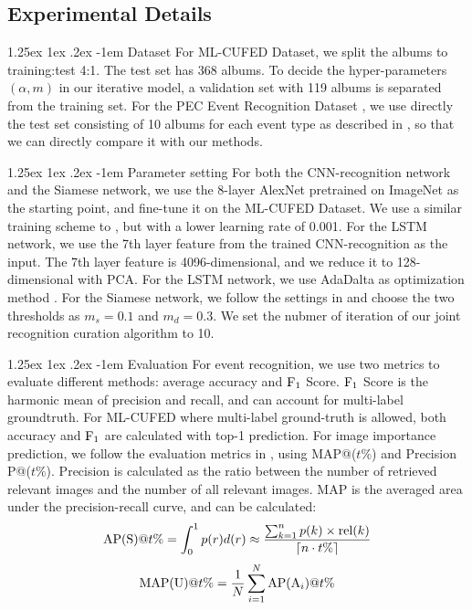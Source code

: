 \documentclass[runningheads]{llncs}
\makeatletter
\renewcommand\paragraph{\@startsection{paragraph}{4}{\z@}%
           {1.25ex \@plus1ex \@minus.2ex}%
           {-1em}%
           {\normalfont\normalsize\bfseries}}
\makeatother
\begin{document}
\subsection{Experimental Details}
\paragraph{Dataset} For ML-CUFED Dataset, we split the albums to training:test 4:1. The test set has 368 albums. To decide the hyper-parameters $(\alpha, m)$ in our iterative model, a validation set with 119 albums is separated from the training set.  For the PEC Event Recognition Dataset \cite{HMM}, we use directly the test set consisting of 10 albums for each event type as described in \cite{HMM}, so that we can directly compare it with our methods.

\paragraph{Parameter setting} For both the CNN-recognition network and the Siamese network, we use the 8-layer AlexNet \cite{imagenet} pretrained on ImageNet as the starting point, and fine-tune it on the ML-CUFED Dataset. We use a similar training scheme to \cite{caffe}, but with a lower learning rate of 0.001. For the LSTM network, we use the 7th layer feature from the trained CNN-recognition as the input. The 7th layer feature is 4096-dimensional, and we reduce it to 128-dimensional with PCA. For the LSTM network, we use AdaDalta as optimization method \cite{adadelta,theano1,theano2}. For the Siamese network, we follow the settings in \cite{CVPR} and choose the two thresholds as $m_{s} = 0.1$ and $m_{d}=0.3$. We set the nubmer of iteration of our joint recognition curation algorithm to 10.

\paragraph{Evaluation} For event recognition, we use two metrics to evaluate different methods: average accuracy and $\textup{F}_{1}$ Score.  $\textup{F}_{1}$ Score is the harmonic mean of precision and recall, and can account for multi-label groundtruth. For ML-CUFED where multi-label ground-truth is allowed, both accuracy and $\textup{F}_{1}$ are calculated with top-1 prediction. For image importance prediction, we follow the evaluation metrics in \cite{CVPR}, using MAP@($t\%$) and Precision P@($t\%$).  Precision is calculated as the ratio between the number of retrieved relevant images and the number of all relevant images. MAP is the averaged area under the precision-recall curve, and can be calculated:
\begin{equation}
\textup{AP(S)}@t\%=\int_{0}^{1}p(r)d(r)\approx \frac{\sum_{k=1}^{n}p(k)\times \textup{rel}(k)}{\left \lceil n\cdot t\% \right \rceil}
\end{equation}
\begin{equation}
\textup{MAP(U)}@t\% = \frac{1}{N}\sum_{i=1}^{N}\textup{AP}(\textup{A}_{i})@t\%
\end{equation}
\end{document}

